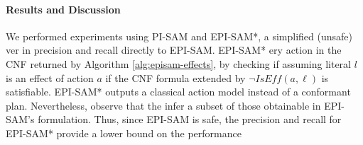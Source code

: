 \documentclass[letterpaper]{article} %
\newcommand{\iseff}{\textit{IsEff}}
\newcommand{\hai}[1]{{\textcolor{orange}{[Hai: #1]}}}
\newcommand{\roni}[1]{ }
\begin{document}

\paragraph{Results and Discussion}
We performed experiments using PI-SAM and EPI-SAM*, a simplified (unsafe) ver in   precision and recall directly to EPI-SAM.
EPI-SAM* ery action in the CNF returned by Algorithm \ref{alg:episam-effects}, by checking if assuming literal $l$ is an effect of action $a$ if the CNF formula extended by $\neg\iseff(a,\ell)$ is satisfiable.\roni{This sentence is not clear.}
EPI-SAM* outputs a classical action model instead of a conformant plan. %
Nevertheless, observe that the infer a subset of those obtainable in EPI-SAM's formulation. Thus, since EPI-SAM is safe, the precision and recall for EPI-SAM* provide a lower bound on the performance  %
\end{document}
